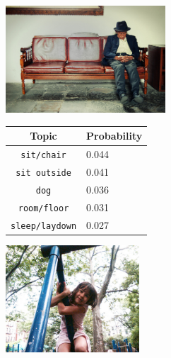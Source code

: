 \documentclass[twoside,twocolumn]{article}
\begin{document}
	\begin{figure}
		\begin{subfigure}{\textwidth}
			\centering
			\begin{minipage}[t][4cm]{.5\linewidth}
				\centering
				\vspace{0pt}
				\includegraphics[height=4cm]{Images/4862204000.jpg}
			\end{minipage}\hfill
			\begin{minipage}[t]{.5\textwidth}
				\centering
				\vspace{0pt}
				\begin{tabular}{cl}
					Topic                           & Probability\\
					\hline
					\texttt{sit/chair}             & 0.044 \\
					\texttt{sit outside}                   & 0.041 \\
					\texttt{dog}                 & 0.036 \\
					\texttt{room/floor}           & 0.031 \\
					\texttt{sleep/laydown}        & 0.027\\
					\hline
				\end{tabular}
			\end{minipage}
		\end{subfigure}
		\vspace*{4mm}
		\begin{subfigure}{\textwidth}
			\centering
			\begin{minipage}[t][4cm]{.5\linewidth}
				\centering
				\vspace{0pt}
				\includegraphics[height=4cm]{Images/3643021980.jpg}
			\end{minipage}\hfill

\end{subfigure}
\end{figure}
\end{document}
